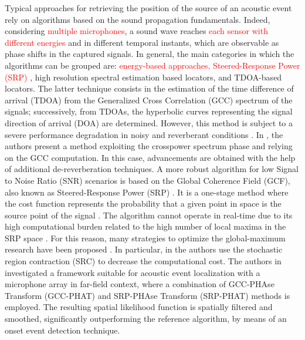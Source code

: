\documentclass[review]{elsarticle}
\begin{document}
Typical approaches for retrieving the position of the source of an acoustic event rely on algorithms based on the 
sound propagation fundamentals. Indeed, considering \textcolor{red}{multiple microphones}, a sound wave reaches \textcolor{red}{each sensor with different energies} and in different temporal instants, which are observable as phase shifts in the captured signals.  %
In general, the main categories in which the algorithms can be grouped are: \textcolor{red}{energy-based approaches, Steered-Response Power (SRP) \cite{brandstein1997robust}}, high resolution spectral estimation based locators, and TDOA-based locators. The latter technique consists in the estimation of the time difference of arrival (TDOA) from the Generalized Cross Correlation (GCC) spectrum of the signals; successively, from TDOAs, the hyperbolic curves representing the signal direction of arrival (DOA) are determined. However, this method is subject to a severe performance degradation in noisy and reverberant conditions \cite{champagne1996performance}. In \cite{tsiami2014experiments}, the authors present a method exploiting the crosspower spectrum phase and relying on the GCC computation. In this case, advancements are obtained with the help of additional de-reverberation techniques.
A more robust algorithm for low Signal to Noise Ratio (SNR) scenarios is based on the Global Coherence Field (GCF), also known as Steered-Response Power (SRP) \cite{brandstein1997robust}. It is a one-stage method where the cost function represents the probability that a given point in space is the source point of the signal \cite{brutti2007classification}. The algorithm cannot operate in real-time due to its high computational burden related to the high number of local maxima in the SRP space \cite{yook2016fast}. For this reason, many strategies to optimize the global-maximum research have been proposed \cite{DoSY07,Minotto2012,Lee2016}. In particular, in \cite{DoSY07} the authors use the stochastic region contraction (SRC) to decrease the computational cost. The authors in \cite{transfeld2015acoustic} investigated a framework  suitable for acoustic event localization with a microphone array in far-field context, where a combination of GCC-PHAse Transform (GCC-PHAT) and SRP-PHAse Transform (SRP-PHAT) methods is employed. The resulting spatial likelihood function is spatially filtered and smoothed, significantly outperforming the reference algorithm, by means of an onset event detection technique. 
\end{document}
